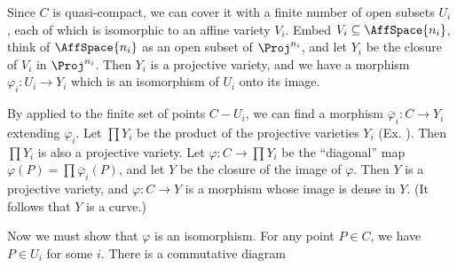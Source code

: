 {Since $C$ is quasi-compact, we can cover it with a finite number of open subsets $U_i$, each of which is isomorphic to an affine variety $V_i$. Embed $V_i\subseteq\AffSpace{n_i}$, think of $\AffSpace{n_i}$ as an open subset of $\Proj^{n_i}$, and let $Y_i$ be the closure of $V_i$ in $\Proj^{n_i}$. Then $Y_i$ is a projective variety, and we have a morphism $\varphi_i\colon U_i\to Y_i$ which is an isomorphism of $U_i$ onto its image.

By  applied to the finite set of points $C-U_i$, we can find a morphism $\overline\varphi_i\colon C\to Y_i$ extending $\varphi_i$. Let $\prod Y_i$ be the product of the projective varieties $Y_i$ (Ex. ). Then $\prod Y_i$ is also a projective variety. Let $\varphi\colon C\to\prod Y_i$ be the \textquotedblleft{}diagonal\textquotedblright{} map $\varphi(P)=\prod\overline\varphi_i(P)$, and let $Y$ be the closure of the image of $\varphi$. Then $Y$ is a projective variety, and $\varphi\colon C\to Y$ is a morphism whose image is dense in $Y$. (It follows that $Y$ is a curve.)

Now we must show that $\varphi$ is an isomorphism. For any point $P\in C$, we have $P\in U_i$ for some $i$. There is a commutative diagram}
